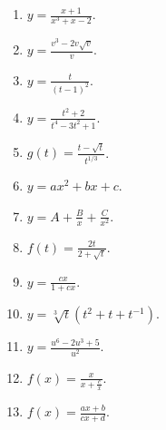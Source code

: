 \begin{problem}
\begin{multicols}{3}
\begin{enumerate}
\item $y=\frac{x+1}{x^3+x-2}$.
\item $y=\frac{v^3-2v\sqrt{v}}{v}$.
\item $y=\frac{t}{(t-1)^2}$.
\item $y=\frac{t^2+2}{t^4-3t^2+1}$.
\item $g(t)=\frac{t-\sqrt{t}}{t^{1/3}}$.
\item $y=a x^2+b x + c$.
\item $y=A+\frac{B}x +\frac{C}{x^2}$.
\item $f(t)=\frac{2t}{2+\sqrt{t}}$.
\item $y=\frac{c x}{1+c x}$.
\item $y=\sqrt[3]{t}(t^2+t+t^{-1}) $.
\item $y=\frac{u^6-2u^3+5}{u^2}$.
\item $f(x)=\frac{x}{x+\frac{c}{x}}$.
\item $f(x)=\frac{a x+b}{c x+ d}$.
\end{enumerate}
\end{multicols}
\end{problem}